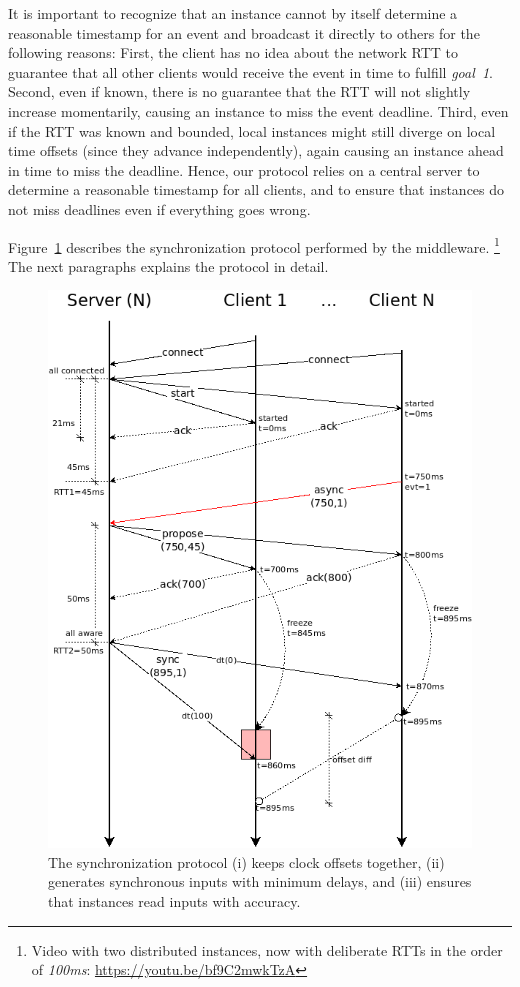 \documentclass[sigplan,screen]{acmart}
\begin{document}
It is important to recognize that an instance cannot by itself determine a
reasonable timestamp for an event and broadcast it directly to others for the
following reasons:
%
First, the client has no idea about the network RTT to guarantee that all other
clients would receive the event in time to fulfill \emph{goal~1}.
%
Second, even if known, there is no guarantee that the RTT will not slightly
increase momentarily, causing an instance to miss the event deadline.
%
Third, even if the RTT was known and bounded, local instances might still
diverge on local time offsets (since they advance independently), again causing
an instance ahead in time to miss the deadline.
%
Hence, our protocol relies on a central server to determine a reasonable
timestamp for all clients, and to ensure that instances do not miss deadlines
even if everything goes wrong.

Figure~\ref{fig.protocol} describes the synchronization protocol performed by
the middleware.%
\footnote {
    Video with two distributed instances, now with deliberate RTTs in the order
    of \emph{100ms}: \url{https://youtu.be/bf9C2mwkTzA}
}
The next paragraphs explains the protocol in detail.

\begin{figure}[t]
  \centering
  \includegraphics[width=\linewidth]{protocol}
  \caption{
    \label{fig.protocol}
    The synchronization protocol
        (i) keeps clock offsets together,
        (ii) generates synchronous inputs with minimum delays, and
        (iii) ensures that instances read inputs with accuracy.
  }
\end{figure}
\end{document}
